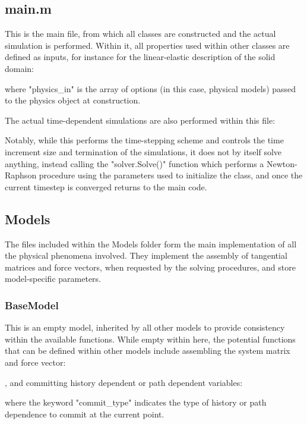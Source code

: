 \documentclass[3p]{elsarticle} %
\begin{document}
\subsection{main.m}
This is the main file, from which all classes are constructed and the actual simulation is performed. Within it, all properties used within other classes are defined as inputs, for instance for the linear-elastic description of the solid domain:

where "physics{\_}in" is the array of options (in this case, physical models) passed to the physics object at construction. 

The actual time-dependent simulations are also performed within this file:


Notably, while this performs the time-stepping scheme and controls the time increment size and termination of the simulations, it does not by itself solve anything, instead calling the "solver.Solve()" function which performs a Newton-Raphson procedure using the parameters used to initialize the class, and once the current timestep is converged returns to the main code.

\subsection{Models}
The files included within the Models folder form the main implementation of all the physical phenomena involved. They implement the assembly of tangential matrices and force vectors, when requested by the solving procedures, and store model-specific parameters. 

\subsubsection{BaseModel}
This is an empty model, inherited by all other models to provide consistency within the available functions. While empty within here, the potential functions that can be defined within other models include assembling the system matrix and force vector:

, and committing history dependent or path dependent variables:

where the keyword "commit{\_}type" indicates the type of history or path dependence to commit at the current point. 
\end{document}
